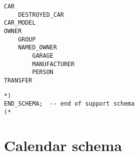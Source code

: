 \documentclass{article}
\begin{document}
\begin{small}
\begin{verbatim}
CAR
    DESTROYED_CAR
CAR_MODEL
OWNER
    GROUP
    NAMED_OWNER
        GARAGE
        MANUFACTURER
        PERSON
TRANSFER
\end{verbatim}
\end{small}

\begin{small}
\begin{verbatim}
*)
END_SCHEMA;  -- end of support schema
(*
\end{verbatim}
\end{small}

\section{Calendar schema}
\end{document}
